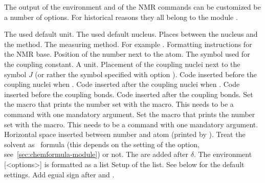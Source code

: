 \documentclass{chemmacros-manual}
\begin{document}
The output of the environment and of the NMR commands can be customized be a
number of options.  For historical reasons they all belong to the module
.
\begin{options}
    The used default unit.
    The used default nucleus.
  \Default{-}
    Places  between the nucleus and the method.
    The measuring method.
  \Default
    For example .
  \Default
    Formatting instructions for the NMR base.
    Position of the number next to the atom.
    The symbol used for the coupling constant.
    A  unit.
    Placement of the coupling nuclei next to the symbol $J$ (or rather the
    symbol specified with option ).
  \Default{(}
    Code inserted before the coupling nuclei when .
  \Default{)}
    Code inserted after the coupling nuclei when .
  \Default
    Code inserted before the coupling bonds.
  \Default{\cs*{!}}
    Code inserted after the coupling bonds.
    Set the macro that prints the number set with the  macro.  This
    needs to be a command with one mandatory argument.
    Set the macro that prints the number set with the \cs{\#} macro.  This
    needs to be a command with one mandatory argument.
  \Default{.16667em}
    Horizontal space inserted between number and atom
    (printed by \cs{\#}).
    Treat the solvent as \chemformula\ formula (this depends on the setting of
    the  option, see~\vref{sec:chemformula-module}) or not.
  \Default
    The  are added after $\delta$.
    The environment [<options>]{} is formatted as a list
    Setup of the list. See below for the default settings.
    Add egual sign after  and .
\end{options}
\end{document}
